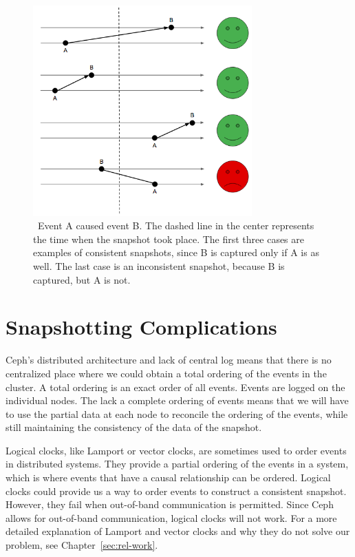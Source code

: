 \begin{figure}[!htbp]
  \centering
  \caption{~Event A caused event B. The dashed line in the center represents the time when the snapshot took place. The first three cases are examples of consistent snapshots, since B is captured only if A is as well. The last case is an inconsistent snapshot, because B is captured, but A is not.} 
  \label{fig:consistency}
  \includegraphics[width=0.75\textwidth]{consistency.png}
\end{figure}

\section{Snapshotting Complications}

Ceph's distributed architecture and lack of central log means that
there is no centralized place where we could obtain a total ordering
of the events in the cluster. A total ordering is an exact order of
all events. Events are logged on the individual nodes. The lack a complete 
ordering of events means that we will have to use the partial data at each 
node to reconcile the ordering of the events, while still maintaining the 
consistency of the data of the snapshot.

Logical clocks, like Lamport or vector clocks, are sometimes used to
order events in distributed systems. They provide a partial ordering
of the events in a system, which is where events that have a causal
relationship can be ordered. Logical clocks could provide
us a way to order events to construct a consistent snapshot. However,
they fail when out-of-band communication is permitted. Since Ceph
allows for out-of-band communication, logical clocks will
not work. For a more detailed explanation of Lamport and vector clocks
and why they do not solve our problem, see Chapter~\ref{sec:rel-work}.


